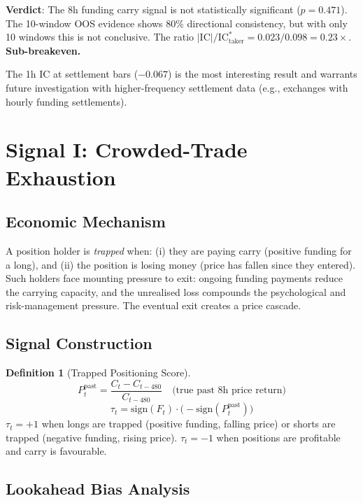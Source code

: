 \documentclass[12pt, a4paper]{article}
\theoremstyle{definition}
\newtheorem{definition}{Definition}[section]
\newcommand{\IC}{\mathrm{IC}}
\newcommand{\sign}{\mathrm{sign}}
\begin{document}
\textbf{Verdict}: The 8h funding carry signal is not statistically significant
($p = 0.471$). The 10-window OOS evidence shows 80\% directional consistency,
but with only 10 windows this is not conclusive. The ratio
$|\IC|/\IC^*_{\text{taker}} = 0.023/0.098 = 0.23\times$. \textbf{Sub-breakeven.}

The 1h IC at settlement bars ($-0.067$) is the most interesting result and
warrants future investigation with higher-frequency settlement data (e.g.,
exchanges with hourly funding settlements).


\section{Signal I: Crowded-Trade Exhaustion}

\subsection{Economic Mechanism}

A position holder is \emph{trapped} when:
(i) they are paying carry (positive funding for a long), and
(ii) the position is losing money (price has fallen since they entered).
Such holders face mounting pressure to exit: ongoing funding payments reduce
the carrying capacity, and the unrealised loss compounds the psychological
and risk-management pressure. The eventual exit creates a price cascade.

\subsection{Signal Construction}

\begin{definition}[Trapped Positioning Score]
  \[
    P_t^{\text{past}} = \frac{C_t - C_{t-480}}{C_{t-480}}
    \quad \text{(true past 8h price return)}
  \]
  \[
    \tau_t = \sign(F_t) \cdot \bigl(-\sign(P_t^{\text{past}})\bigr)
  \]
  $\tau_t = +1$ when longs are trapped (positive funding, falling price) or
  shorts are trapped (negative funding, rising price).
  $\tau_t = -1$ when positions are profitable and carry is favourable.
\end{definition}

\subsection{Lookahead Bias Analysis}
\end{document}
